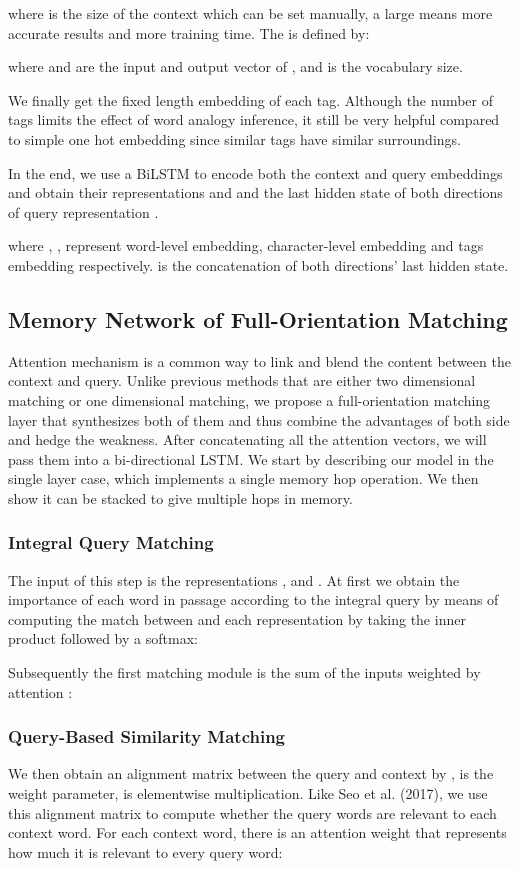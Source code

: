 \documentclass[letterpaper]{article}
\begin{document}
where  is the size of the context which can be set manually, a large  means more accurate results and more training time. The  is defined by:

where  and  are the input and output vector of , and  is the vocabulary size. 

We finally get the fixed length embedding of each tag. Although the number of tags limits the effect of word analogy inference, it still be very helpful compared to simple one hot embedding since similar tags have similar surroundings.

In the end, we use a BiLSTM to encode both the context and query embeddings and obtain their representations  and  and the last hidden state of both directions of query representation .
 
 
where , ,  represent word-level embedding, character-level embedding and tags embedding respectively.  is the concatenation of both directions' last hidden state.

\subsection{Memory Network of Full-Orientation Matching}
Attention mechanism is a common way to link and blend the content between the context and query. Unlike previous methods that are either two dimensional matching or one dimensional matching, we propose a full-orientation matching layer that synthesizes both of them and thus combine the advantages of both side and hedge the weakness. After concatenating all the attention vectors, we will pass them into a bi-directional LSTM. We start by describing our model in the single layer case, which implements a single memory hop operation. We then show it can be stacked to give multiple hops in memory. \\

\subsubsection{Integral Query Matching}
The input of this step is the representations ,  and . At first we obtain the importance of each word in passage according to the integral query by means of computing the match between  and each representation    by taking the inner product followed by a softmax:


Subsequently the first matching module is the sum of the inputs  weighted by attention :


\subsubsection{Query-Based Similarity Matching}
We then obtain an alignment matrix  between the query and context by ,  is the weight parameter,  is elementwise multiplication. Like Seo et al. (2017), we use this alignment matrix to compute whether the query words are relevant to each context word. For each context word, there is an attention weight that represents how much it is relevant to every query word:
\end{document}
